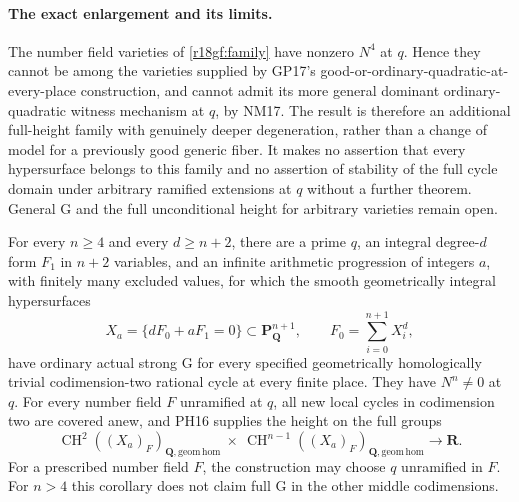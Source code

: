 \paragraph{The exact enlargement and its limits.}
The number field varieties of \eqref{r18gf:family} have nonzero
$N^4$ at $q$.  Hence they cannot be among the varieties supplied
by GP17's good-or-ordinary-quadratic-at-every-place construction,
and cannot admit its more general dominant ordinary-quadratic
witness mechanism at $q$, by NM17.  The result is therefore an
additional full-height family with genuinely deeper degeneration,
rather than a change of model for a previously good generic fiber.
It makes no assertion that every hypersurface belongs to this
family and no assertion of stability of the full cycle domain under
arbitrary ramified extensions at $q$ without a further theorem.
General G and the full unconditional height for arbitrary varieties
remain open.

\begin{corollary}
\label{r18gf:all-dimensions}
For every $n\ge4$ and every $d\ge n+2$, there are a prime
$q$, an integral degree-$d$ form $F_1$ in $n+2$ variables,
and an infinite arithmetic progression of integers $a$,
with finitely many excluded values, for which the smooth
geometrically integral hypersurfaces
\[
 X_a=\{dF_0+aF_1=0\}\subset\mathbf P^{n+1}_{\mathbf Q},
 \qquad F_0=\sum_{i=0}^{n+1}X_i^d,
 \tag{GF18.7}\label{r18gf:general-family}
\]
have ordinary actual strong G for every specified
geometrically homologically trivial codimension-two
rational cycle at every finite place.  They have
$N^n\ne0$ at $q$.  For every number field $F$ unramified
at $q$, all new local cycles in codimension two are
covered anew, and PH16 supplies the height on the full
groups
\[
 \operatorname{CH}^2((X_a)_F)_{\mathbf Q,\mathrm{geom\,hom}}
 \ \times\
 \operatorname{CH}^{n-1}((X_a)_F)_{\mathbf Q,\mathrm{geom\,hom}}
                         \longrightarrow\mathbf R.
 \tag{GF18.8}\label{r18gf:general-height}
\]
For a prescribed number field $F$, the construction may
choose $q$ unramified in $F$.  For $n>4$ this corollary
does not claim full G in the other middle codimensions.
\end{corollary}

